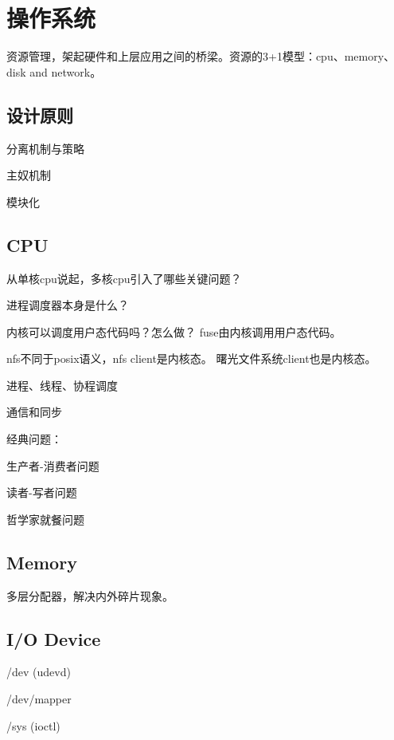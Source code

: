 \chapter{操作系统}

资源管理，架起硬件和上层应用之间的桥梁。资源的3+1模型：cpu、memory、disk and network。

\section{设计原则}

\begin{enumbox}
\item 分离机制与策略
\item 主奴机制
\item 模块化
\end{enumbox}

\section{CPU}

从单核cpu说起，多核cpu引入了哪些关键问题？

进程调度器本身是什么？

内核可以调度用户态代码吗？怎么做？
fuse由内核调用用户态代码。

nfs不同于posix语义，nfs client是内核态。
曙光文件系统client也是内核态。

进程、线程、协程调度

通信和同步

经典问题：
\begin{enumbox}
\item 生产者-消费者问题
\item 读者-写者问题
\item 哲学家就餐问题
\end{enumbox}

\section{Memory}

多层分配器，解决内外碎片现象。

\section{I/O Device}

\begin{enumbox}
\item /dev (udevd)
\item /dev/mapper
\item /sys (ioctl)
\end{enumbox}

